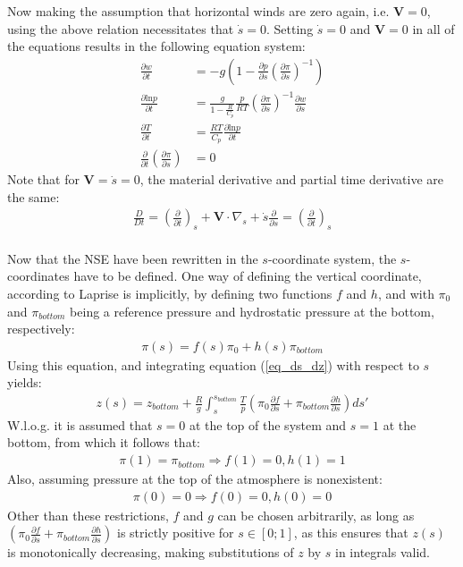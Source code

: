 Now making the assumption that horizontal winds are zero again, i.e. $\textbf{V}=0$, using the above relation necessitates that $\dot{s}=0$.
Setting $\dot{s}=0$ and $\textbf{V}=0$ in all of the equations results in the following equation system:
\begin{align*}
\frac{\partial w}{\partial t} &= -g\left(1 - \frac{\partial p}{\partial s}\left(\frac{\partial \pi}{\partial s}\right)^{-1}\right) \\
\frac{\partial \text{ln}p}{\partial t} &= \frac{g}{1- \frac{R}{C_p}} \frac{p}{RT}\left(\frac{\partial \pi}{\partial s}\right)^{-1} \frac{\partial w}{\partial s}\\
\frac{\partial T}{\partial t} &= \frac{RT}{C_p}\frac{\partial \text{ln}p}{\partial t}\\
\frac{\partial}{\partial t}\left(\frac{\partial \pi}{\partial s}\right) &= 0
\end{align*}
Note that for $\textbf{V}=\dot{s}=0$, the material derivative and partial time derivative are the same:
\begin{align*}
\frac{D}{Dt} = \left(\frac{\partial}{\partial t}\right)_s + \textbf{V} \cdot \nabla _s + \dot{s}\frac{\partial }{\partial s} = \left(\frac{\partial}{\partial t}\right)_s
\end{align*}
\\
Now that the NSE have been rewritten in the $s$-coordinate system, the $s$-coordinates have to be defined.
One way of defining the vertical coordinate, according to Laprise \cite{laprise1992euler} is implicitly, by defining two functions $f$ and $h$, and with $\pi_0$ and $\pi _{bottom}$ being a reference pressure and hydrostatic pressure at the bottom, respectively:
\begin{align*}
\pi (s) = f(s)\pi_0 + h(s)\pi_{bottom}
\end{align*}
Using this equation, and integrating equation (\ref{eq_ds_dz}) with respect to $s$ yields:
\begin{align}\label{eq_s_to_z}
z(s) = z_{bottom} + \frac{R}{g}\int _s ^{s_{bottom}} \frac{T}{p}\left(\pi_0 \frac{\partial f}{\partial s} + \pi_{bottom} \frac{\partial h}{\partial s}\right)ds'
\end{align}
W.l.o.g. it is assumed that $s=0$ at the top of the system and $s=1$ at the bottom, from which it follows that:
\begin{align*}
\pi(1) = \pi_{bottom} \Rightarrow f(1) = 0 , h(1) = 1
\end{align*}
Also, assuming pressure at the top of the atmosphere is nonexistent:
\begin{align*}
\pi(0) = 0 \Rightarrow f(0) = 0, h(0) = 0
\end{align*}
Other than these restrictions, $f$ and $g$ can be chosen arbitrarily, as long as $\left(\pi_0 \frac{\partial f}{\partial s} + \pi_{bottom} \frac{\partial h}{\partial s}\right)$ is strictly positive for $s\in[0;1]$, as this ensures that $z(s)$ is monotonically decreasing, making substitutions of $z$ by $s$ in integrals valid.

